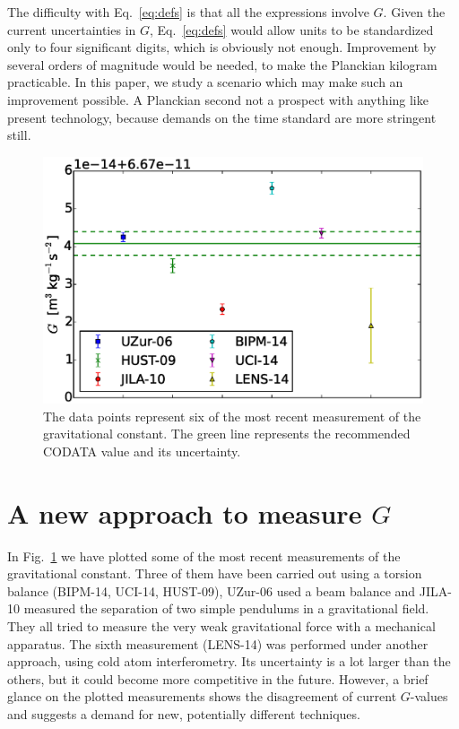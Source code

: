 \documentclass[prb,preprint]{revtex4-1}
\begin{document}
The difficulty with Eq.~\eqref{eq:defs} is that all the expressions
involve $G$.  Given the current uncertainties in $G$,
Eq.~\eqref{eq:defs} would allow units to be standardized only to four
significant digits, which is obviously not enough.  Improvement by
several orders of magnitude would be needed, to make the Planckian
kilogram practicable.  In this paper, we study a scenario which may
make such an improvement possible.  A Planckian second not a prospect
with anything like present technology, because demands on the time
standard are more stringent still.\\




\begin{figure}
	\centering
	\includegraphics[width=\textwidth]{img/plotGmeas}
	\caption{The data points represent six of the most recent measurement of the gravitational constant. The green line represents the recommended CODATA value and its uncertainty.}
	\label{fig:Gmeasurements}
\end{figure}

\section{A new approach to measure $G$}

In Fig.~\ref{fig:Gmeasurements} we have plotted some of the most recent measurements of the gravitational constant. Three of them have been carried out using a torsion balance (BIPM-14\cite{Quinn14}, UCI-14\cite{Newman14}, HUST-09\cite{Luo09}), UZur-06\cite{Schlamminger06} used a beam balance and JILA-10\cite{Parks10} measured the separation of two simple pendulums in a gravitational field. They all tried to measure the very weak gravitational force with a mechanical apparatus. The sixth measurement (LENS-14\cite{Rosi14}) was performed under another approach, using cold atom interferometry. Its uncertainty is a lot larger than the others, but it could become more competitive in the future. However, a brief glance on the plotted measurements shows the disagreement of current $G$-values and suggests a demand for new, potentially different techniques.\\ 
\end{document}
